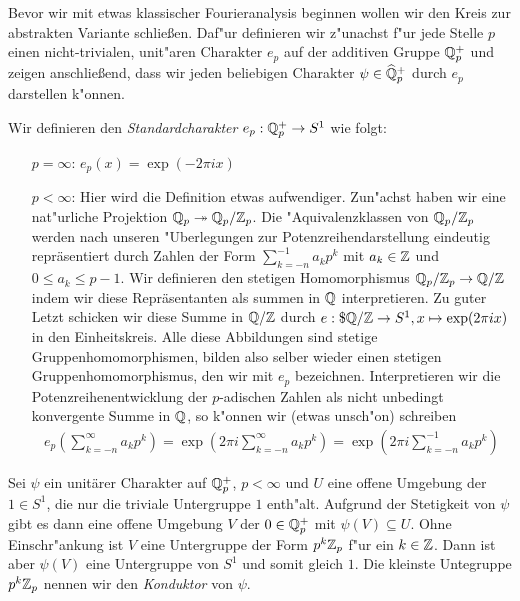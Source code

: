 		Bevor wir mit etwas klassischer Fourieranalysis beginnen wollen wir den Kreis zur abstrakten Variante schließen.
		Daf"ur definieren wir z"unachst f"ur jede Stelle $p$ einen nicht-trivialen, unit"aren Charakter $e_p$ auf der additiven Gruppe $\mathbb{Q}_p^+$ und zeigen anschließend, dass wir jeden beliebigen Charakter $\psi \in \widehat{\mathbb{Q}}_p^+$ durch $e_p$ darstellen k"onnen.
		\begin{defi}
			Wir definieren den \emph{Standardcharakter} $e_p:\mathbb{Q}_p^+ \to S^1$ wie folgt:
			\begin{itemize}[itemindent=3em]
				\item [$p=\infty$:] $e_p(x) = \exp(-2\pi i x)$
				\item [$p<\infty$:] Hier wird die Definition etwas aufwendiger. Zun"achst haben wir eine nat"urliche Projektion ${\mathbb{Q}_p} \twoheadrightarrow {\mathbb{Q}_p}/{\mathbb{Z}_p}$.
				Die "Aquivalenzklassen von ${\mathbb{Q}_p}/{\mathbb{Z}_p}$ werden nach unseren "Uberlegungen zur Potenzreihendarstellung eindeutig repräsentiert durch Zahlen der Form $\sum_{k=-n}^{-1} a_kp^k$ mit $a_k \in \mathbb{Z}$ und $0\leq a_k\leq p-1$.
				Wir definieren den stetigen Homomorphismus ${\mathbb{Q}_p}/{\mathbb{Z}_p} \to \mathbb{Q}/\mathbb{Z}$ indem wir diese Repräsentanten als summen in $\mathbb{Q}$ interpretieren. 
				Zu guter Letzt schicken wir diese Summe in $\mathbb{Q}/\mathbb{Z}$ durch $e: \$\mathbb{Q}/\mathbb{Z} \to S^1, x \mapsto \exp(2\pi i x)$ in den Einheitskreis. 
				Alle diese Abbildungen sind stetige Gruppenhomomorphismen, bilden also selber wieder einen stetigen Gruppenhomomorphismus, den wir mit $e_p$ bezeichnen.
				Interpretieren wir die Potenzreihenentwicklung der $p$-adischen Zahlen als nicht unbedingt konvergente Summe in $\mathbb{Q}$, so k"onnen wir (etwas unsch"on) schreiben
				\begin{align*}
					e_p\left(\sum_{k=-n}^{\infty} a_kp^k\right) = \exp\left(2\pi i \sum_{k=-n}^{\infty} a_kp^k\right) = \exp\left(2\pi i \sum_{k=-n}^{-1} a_kp^k\right)
				\end{align*}
			\end{itemize}
		\end{defi}
		Sei $\psi$ ein unitärer Charakter auf $\mathbb{Q}_p^+$, $p<\infty$ und $U$ eine offene Umgebung der $1 \in S^1$, die nur die triviale Untergruppe $1$ enth"alt. 
		Aufgrund der Stetigkeit von $\psi$ gibt es dann eine offene Umgebung $V$ der $0\in\mathbb{Q}_p^+$ mit $\psi(V)\subseteq U$. 
		Ohne Einschr"ankung ist $V$ eine Untergruppe der Form $p^k{\mathbb{Z}_p}$ f"ur ein $k\in\mathbb{Z}$. 
		Dann ist aber $\psi(V)$ eine Untergruppe von $S^1$ und somit gleich $1$.
		Die kleinste Untegruppe $p^k{\mathbb{Z}_p}$ nennen wir den \emph{Konduktor} von $\psi$.
	
